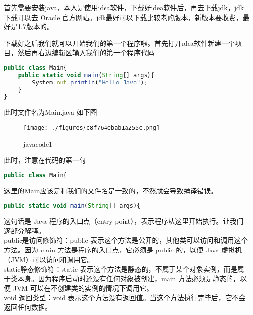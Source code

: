 

首先需要安装java，本人是使用idea软件，下载好idea软件后，再去下载jdk，jdk下载可以去 Oracle 官方网站。jdk最好可以下载比较老的版本，新版本要收费，最好是1.7版本的。

下载好之后我们就可以开始我们的第一个程序啦。首先打开idea软件新建一个项目，然后再右边编辑区输入我们的第一个程序代码
\begin{lstlisting}[language=js]
public class Main{
    public static void main(String[] args){
        System.out.println("Hello Java");
    }
}
\end{lstlisting}
此时文件名为Main.java
如下图\begin{figure}[ht]
\centering
\texttt{[image: ./figures/c8f764ebab1a255c.png]}
\caption{javacode1} \label{fig_java_1}
\end{figure}
此时，注意在代码的第一句
\begin{lstlisting}[language=js]
public class Main{
\end{lstlisting}
这里的Main应该是和我们的文件名是一致的，不然就会导致编译错误。
\begin{lstlisting}[language=js]
 public static void main(String[] args){
\end{lstlisting}

这句话是 Java 程序的入口点（entry point），表示程序从这里开始执行。让我们逐部分解释。\\
public是访问修饰符：public 表示这个方法是公开的，其他类可以访问和调用这个方法。因为 main 方法是程序的入口点，它必须是 public 的，以便 Java 虚拟机（JVM）可以访问和调用它。
\\
static静态修饰符：static 表示这个方法是静态的，不属于某个对象实例，而是属于类本身。因为程序启动时还没有任何对象被创建，main 方法必须是静态的，以便 JVM 可以在不创建类的实例的情况下调用它。\\
void
返回类型：void 表示这个方法没有返回值。当这个方法执行完毕后，它不会返回任何数据。